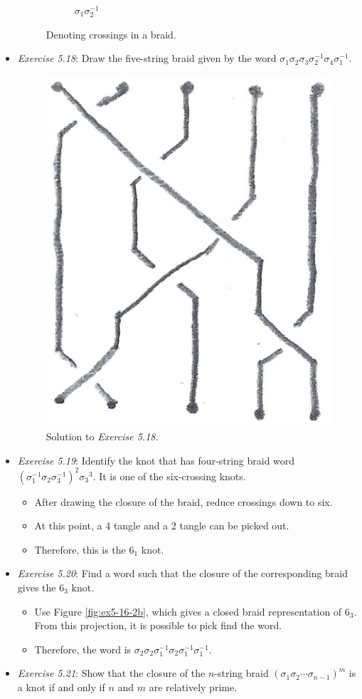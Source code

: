 \documentclass[titlepage]{article}
\numberwithin{figure}{section}
\numberwithin{table}{section}
\numberwithin{equation}{section}
\begin{document}
\begin{itemize}
\begin{figure}[h!]
\begin{subfigure}[b]{0.15\linewidth}
            \caption{$\sigma_1\sigma_2^{-1}$}
            \label{fig:braidcrossingse}
        \end{subfigure}
        \caption{Denoting crossings in a braid.}
        \label{fig:braidcrossings}
    \end{figure}
    \item \emph{Exercise 5.18}: Draw the five-string braid given by the word $\sigma_1\sigma_2\sigma_3\sigma_2^{-1}\sigma_4\sigma_1^{-1}$.
    \begin{figure}[h!]
        \centering
        \includegraphics[width=0.12\linewidth]{Blender/ex5-18.png}
        \caption{Solution to \emph{Exercise 5.18}.}
        \label{fig:ex5-18}
    \end{figure}
    \item \emph{Exercise 5.19}: Identify the knot that has four-string braid word $\left( \sigma_1^{-1}\sigma_2\sigma_3^{-1} \right)^2{\sigma_3}^3$. It is one of the six-crossing knots.
    \begin{itemize}
        \item After drawing the closure of the braid, reduce crossings down to six.
        \item At this point, a 4 tangle and a 2 tangle can be picked out.
        \item Therefore, this is the $6_1$ knot.
    \end{itemize}
    \item \emph{Exercise 5.20}: Find a word such that the closure of the corresponding braid gives the $6_3$ knot.
    \begin{itemize}
        \item Use Figure \ref{fig:ex5-16-2b}, which gives a closed braid representation of $6_3$. From this projection, it is possible to pick find the word.
        \item Therefore, the word is $\sigma_2\sigma_2\sigma_1^{-1}\sigma_2\sigma_1^{-1}\sigma_1^{-1}$.
    \end{itemize}
    \item \emph{Exercise 5.21}: Show that the closure of the $n$-string braid $\left( \sigma_1\sigma_2\cdots\sigma_{n-1} \right)^m$ is a knot if and only if $n$ and $m$ are relatively prime.

\end{itemize}
\end{document}
